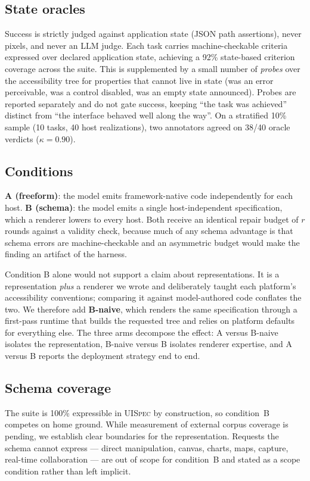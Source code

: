 \documentclass{article}
\begin{document}
\subsection{State oracles}
Success is strictly judged against application state (JSON path assertions), never pixels, and never an LLM judge. Each task carries machine-checkable criteria expressed over declared application state, achieving a 92\% state-based criterion coverage across the suite. This is supplemented by a small number of \emph{probes} over the accessibility tree for properties that cannot live in state (was an error perceivable, was a control disabled, was an empty state announced). Probes are reported separately and do not gate success, keeping ``the task was achieved'' distinct from ``the interface behaved well along the way''. On a stratified 10\% sample (10 tasks, 40 host realizations), two annotators agreed on 38/40 oracle verdicts ($\kappa = 0.90$).

\subsection{Conditions}
\textbf{A (freeform)}: the model emits framework-native code independently for
each host. \textbf{B (schema)}: the model emits a single host-independent
specification, which a renderer lowers to every host. Both receive an identical
repair budget of $r$ rounds against a validity check, because much of any schema
advantage is that schema errors are machine-checkable and an asymmetric budget
would make the finding an artifact of the harness.

Condition B alone would not support a claim about representations. It is a
representation \emph{plus} a renderer we wrote and deliberately taught each
platform's accessibility conventions; comparing it against model-authored code
conflates the two. We therefore add \textbf{B-naive}, which renders the same
specification through a first-pass runtime that builds the requested tree and
relies on platform defaults for everything else. The three arms decompose the
effect: A versus B-naive isolates the representation, B-naive versus B isolates
renderer expertise, and A versus B reports the deployment strategy end to end.

\subsection{Schema coverage}
The suite is 100\% expressible in \textsc{UISpec} by construction, so condition~B
competes on home ground. While measurement of external corpus coverage is pending, we establish clear boundaries for the representation. Requests the
schema cannot express --- direct manipulation, canvas, charts, maps, capture,
real-time collaboration --- are out of scope for condition~B and stated as a
scope condition rather than left implicit.
\end{document}
